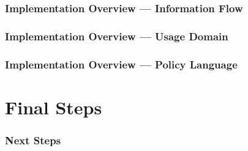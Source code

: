 \documentclass[t,handout, 10pt]{beamer}
\begin{document}
\begin{frame}
\frametitle{Implementation Overview --- Information Flow}
\end{frame}

\begin{frame}
\frametitle{Implementation Overview --- Usage Domain}
\end{frame}

\begin{frame}
\frametitle{Implementation Overview --- Policy Language}
\end{frame}

\section{Final Steps}
\begin{frame}
\frametitle{Next Steps}
\end{frame}
\end{document}
